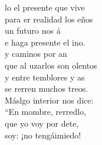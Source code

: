 \begin{cancion}
	lo el presente que vive \\
	para er realidad los eños\\
	un futuro nos á \\
	e haga presente el ino. \\
	y caminos por an \\
	que al uzarlos son olentos\\
	y entre temblores y as \\
	se rerren muchos treos. \\
	Máslgo interior nos dice: \\
	“En mombre, rerredlo,\\
	que yo voy por dete, \\
	 soy: ¡no tengáimiedo!\\
\end{cancion}%
